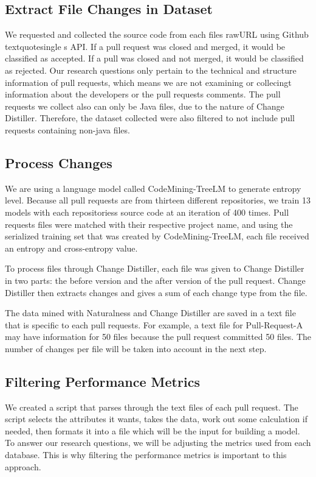 \documentclass[10pt, conference]{IEEEtran}
\begin{document}
\subsection{Extract File Changes in Dataset}
We requested and collected the source code from each file\textquotesingle s rawURL using Github\\textquotesingle s API. If a pull request was closed and merged, it would be classified as accepted. If a pull was closed and not merged, it would be classified as rejected. Our research questions only pertain to the technical and structure information of pull requests, which means we are not examining or collecingt information about the developers or the pull request\textquotesingle s comments. The pull requests we collect also can only be Java files, due to the nature of Change Distiller. Therefore, the dataset collected were also filtered to not include pull requests containing non-java files.

\subsection{Process Changes}
We are using a language model called CodeMining-TreeLM to generate entropy level. Because all pull requests are from thirteen different repositories, we train 13 models with each repositories\textquotesingle s source code at an iteration of 400 times. Pull request\textquotesingle s files were matched with their respective project name, and using the serialized training set that was created by CodeMining-TreeLM, each file received an entropy and cross-entropy value.

To process files through Change Distiller, each file was given to Change Distiller in two parts: the before version and the after version of the pull request. Change Distiller then extracts changes and gives a sum of each change type from the file. 

The data mined with Naturalness and Change Distiller are saved in a text file that is specific to each pull requests. For example, a text file for Pull-Request-A may have information for 50 files because the pull request committed 50 files. The number of changes per file will be taken into account in the next step.

\subsection{Filtering Performance Metrics}
We created a script that parses through the text files of each pull request. The script selects the attributes it wants, takes the data, work out some calculation if needed, then formats it into a file which will be the input for building a model. To answer our research questions, we will be adjusting the metrics used from each database. This is why filtering the performance metrics is important to this approach.
\end{document}
